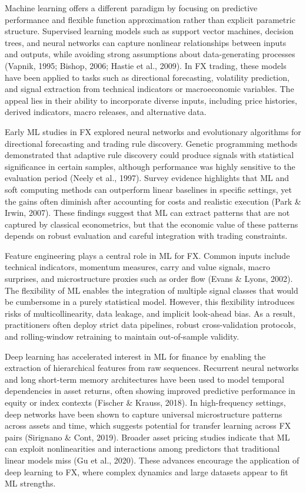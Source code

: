 \documentclass[12pt,a4paper]{article}
\begin{document}
Machine learning offers a different paradigm by focusing on predictive performance and flexible function approximation rather than explicit parametric structure. Supervised learning models such as support vector machines, decision trees, and neural networks can capture nonlinear relationships between inputs and outputs, while avoiding strong assumptions about data-generating processes (Vapnik, 1995; Bishop, 2006; Hastie et al., 2009). In FX trading, these models have been applied to tasks such as directional forecasting, volatility prediction, and signal extraction from technical indicators or macroeconomic variables. The appeal lies in their ability to incorporate diverse inputs, including price histories, derived indicators, macro releases, and alternative data.

Early ML studies in FX explored neural networks and evolutionary algorithms for directional forecasting and trading rule discovery. Genetic programming methods demonstrated that adaptive rule discovery could produce signals with statistical significance in certain samples, although performance was highly sensitive to the evaluation period (Neely et al., 1997). Survey evidence highlights that ML and soft computing methods can outperform linear baselines in specific settings, yet the gains often diminish after accounting for costs and realistic execution (Park \& Irwin, 2007). These findings suggest that ML can extract patterns that are not captured by classical econometrics, but that the economic value of these patterns depends on robust evaluation and careful integration with trading constraints.

Feature engineering plays a central role in ML for FX. Common inputs include technical indicators, momentum measures, carry and value signals, macro surprises, and microstructure proxies such as order flow (Evans \& Lyons, 2002). The flexibility of ML enables the integration of multiple signal classes that would be cumbersome in a purely statistical model. However, this flexibility introduces risks of multicollinearity, data leakage, and implicit look-ahead bias. As a result, practitioners often deploy strict data pipelines, robust cross-validation protocols, and rolling-window retraining to maintain out-of-sample validity.

Deep learning has accelerated interest in ML for finance by enabling the extraction of hierarchical features from raw sequences. Recurrent neural networks and long short-term memory architectures have been used to model temporal dependencies in asset returns, often showing improved predictive performance in equity or index contexts (Fischer \& Krauss, 2018). In high-frequency settings, deep networks have been shown to capture universal microstructure patterns across assets and time, which suggests potential for transfer learning across FX pairs (Sirignano \& Cont, 2019). Broader asset pricing studies indicate that ML can exploit nonlinearities and interactions among predictors that traditional linear models miss (Gu et al., 2020). These advances encourage the application of deep learning to FX, where complex dynamics and large datasets appear to fit ML strengths.
\end{document}
